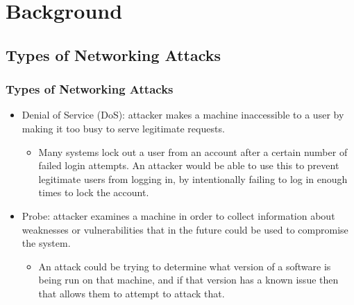 \documentclass{beamer}
\newcommand{\linespace}{\vskip 0.25cm}
\begin{document}
\section[Background]{Background}
\subsection{Types of Networking Attacks}
\begin{frame}
  \frametitle{Types of Networking Attacks}
  \begin{itemize}
  	\item Denial of Service (DoS): attacker makes a machine inaccessible to a user by making it too busy to serve legitimate requests.
  	
  	\begin{itemize}
  		\item Many systems lock out a user from an account after a certain number of failed login attempts. An attacker would be able to use this to prevent legitimate users from logging in, by intentionally failing to log in enough times to lock the account.
  	\end{itemize}



  	

  	\linespace
  	\linespace
  	
  	\item Probe: attacker examines a machine in order to collect information about weaknesses or vulnerabilities that in the future could be used to compromise the system.
  	
  	\begin{itemize}
  		\item An attack could be trying to determine what version of a software is being run on that machine, and if that version has a known issue then that allows them to attempt to attack that.
  	\end{itemize}
  \end{itemize}
\end{frame}
\end{document}
